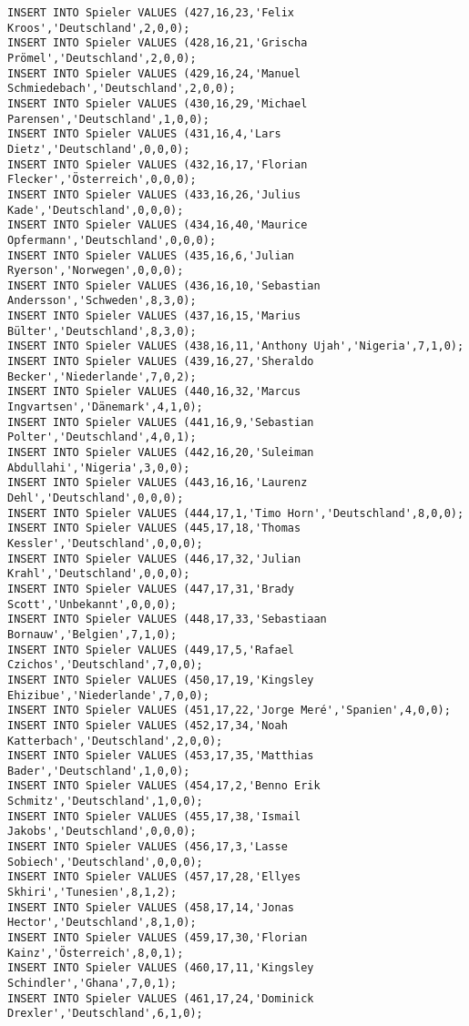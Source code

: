 \documentclass{bschlangaul-aufgabe}
\begin{document}
\begin{verbatim}
INSERT INTO Spieler VALUES (427,16,23,'Felix Kroos','Deutschland',2,0,0);
INSERT INTO Spieler VALUES (428,16,21,'Grischa Prömel','Deutschland',2,0,0);
INSERT INTO Spieler VALUES (429,16,24,'Manuel Schmiedebach','Deutschland',2,0,0);
INSERT INTO Spieler VALUES (430,16,29,'Michael Parensen','Deutschland',1,0,0);
INSERT INTO Spieler VALUES (431,16,4,'Lars Dietz','Deutschland',0,0,0);
INSERT INTO Spieler VALUES (432,16,17,'Florian Flecker','Österreich',0,0,0);
INSERT INTO Spieler VALUES (433,16,26,'Julius Kade','Deutschland',0,0,0);
INSERT INTO Spieler VALUES (434,16,40,'Maurice Opfermann','Deutschland',0,0,0);
INSERT INTO Spieler VALUES (435,16,6,'Julian Ryerson','Norwegen',0,0,0);
INSERT INTO Spieler VALUES (436,16,10,'Sebastian Andersson','Schweden',8,3,0);
INSERT INTO Spieler VALUES (437,16,15,'Marius Bülter','Deutschland',8,3,0);
INSERT INTO Spieler VALUES (438,16,11,'Anthony Ujah','Nigeria',7,1,0);
INSERT INTO Spieler VALUES (439,16,27,'Sheraldo Becker','Niederlande',7,0,2);
INSERT INTO Spieler VALUES (440,16,32,'Marcus Ingvartsen','Dänemark',4,1,0);
INSERT INTO Spieler VALUES (441,16,9,'Sebastian Polter','Deutschland',4,0,1);
INSERT INTO Spieler VALUES (442,16,20,'Suleiman Abdullahi','Nigeria',3,0,0);
INSERT INTO Spieler VALUES (443,16,16,'Laurenz Dehl','Deutschland',0,0,0);
INSERT INTO Spieler VALUES (444,17,1,'Timo Horn','Deutschland',8,0,0);
INSERT INTO Spieler VALUES (445,17,18,'Thomas Kessler','Deutschland',0,0,0);
INSERT INTO Spieler VALUES (446,17,32,'Julian Krahl','Deutschland',0,0,0);
INSERT INTO Spieler VALUES (447,17,31,'Brady Scott','Unbekannt',0,0,0);
INSERT INTO Spieler VALUES (448,17,33,'Sebastiaan Bornauw','Belgien',7,1,0);
INSERT INTO Spieler VALUES (449,17,5,'Rafael Czichos','Deutschland',7,0,0);
INSERT INTO Spieler VALUES (450,17,19,'Kingsley Ehizibue','Niederlande',7,0,0);
INSERT INTO Spieler VALUES (451,17,22,'Jorge Meré','Spanien',4,0,0);
INSERT INTO Spieler VALUES (452,17,34,'Noah Katterbach','Deutschland',2,0,0);
INSERT INTO Spieler VALUES (453,17,35,'Matthias Bader','Deutschland',1,0,0);
INSERT INTO Spieler VALUES (454,17,2,'Benno Erik Schmitz','Deutschland',1,0,0);
INSERT INTO Spieler VALUES (455,17,38,'Ismail Jakobs','Deutschland',0,0,0);
INSERT INTO Spieler VALUES (456,17,3,'Lasse Sobiech','Deutschland',0,0,0);
INSERT INTO Spieler VALUES (457,17,28,'Ellyes Skhiri','Tunesien',8,1,2);
INSERT INTO Spieler VALUES (458,17,14,'Jonas Hector','Deutschland',8,1,0);
INSERT INTO Spieler VALUES (459,17,30,'Florian Kainz','Österreich',8,0,1);
INSERT INTO Spieler VALUES (460,17,11,'Kingsley Schindler','Ghana',7,0,1);
INSERT INTO Spieler VALUES (461,17,24,'Dominick Drexler','Deutschland',6,1,0);

\end{verbatim}
\end{document}
